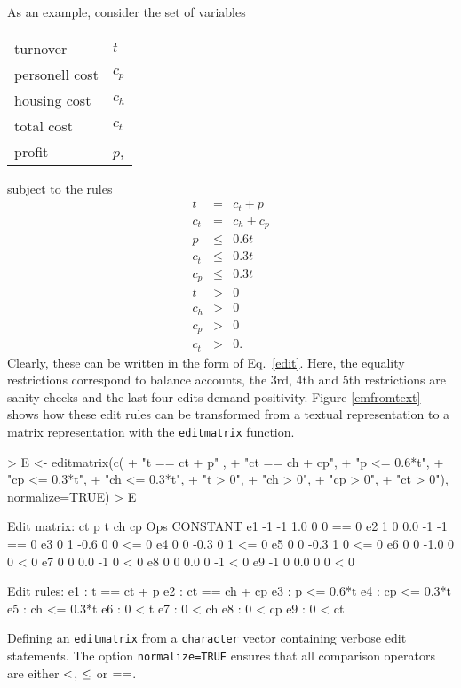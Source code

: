 \documentclass[10pt, fleqn, a4paper]{article}
\begin{document}
As an example, consider the set of variables
\begin{center}
\begin{tabular}{ll}
turnover       & $t$ \\
personell cost & $c_p$\\
housing cost   & $c_h$\\
total cost     & $c_t$\\
profit         & $p$, \\
\end{tabular}
\end{center}
subject to the rules
\begin{eqnarray}
\label{e1}
t   &=& c_t + p\\
c_t &=& c_h + c_p\\ 
p &\leq& 0.6t\\
c_t &\leq& 0.3t\\
c_p&\leq& 0.3t\\
t   &>& 0\\
c_h &>& 0\\
c_p &>& 0\\
\label{e9}
c_t &>& 0.
\end{eqnarray}
Clearly, these can be written in the form of Eq.\ \eqref{edit}.  Here, the
equality restrictions correspond to balance accounts, the 3rd, 4th and 5th
restrictions are sanity checks and the last four edits demand positivity.  
Figure \ref{emfromtext} shows how these edit rules can be
transformed from a textual representation to a matrix representation with the
{\tt editmatrix} function.
%
\begin{Rcode}
\begin{Schunk}
\begin{Sinput}
> E <- editmatrix(c(
+ "t  == ct + p" ,
+ "ct == ch + cp",
+ "p  <= 0.6*t",
+ "cp <= 0.3*t",
+ "ch <= 0.3*t",
+ "t  >  0",
+ "ch >  0",
+ "cp >  0",
+ "ct >  0"), normalize=TRUE)
> E
\end{Sinput}
\begin{Soutput}
Edit matrix:
   ct  p    t ch cp Ops CONSTANT
e1 -1 -1  1.0  0  0  ==        0
e2  1  0  0.0 -1 -1  ==        0
e3  0  1 -0.6  0  0  <=        0
e4  0  0 -0.3  0  1  <=        0
e5  0  0 -0.3  1  0  <=        0
e6  0  0 -1.0  0  0   <        0
e7  0  0  0.0 -1  0   <        0
e8  0  0  0.0  0 -1   <        0
e9 -1  0  0.0  0  0   <        0

Edit rules:
e1 : t == ct + p 
e2 : ct == ch + cp 
e3 : p <= 0.6*t 
e4 : cp <= 0.3*t 
e5 : ch <= 0.3*t 
e6 : 0 < t 
e7 : 0 < ch 
e8 : 0 < cp 
e9 : 0 < ct  
\end{Soutput}
\end{Schunk}
\caption{Defining an {\tt editmatrix} from a {\tt character} vector containing verbose edit statements.
The option {\tt normalize=TRUE} ensures that all comparison operators are either ${\tt <}$, ${\tt \leq}$ or ${\tt ==}$.}
\label{emfromtext}
\end{Rcode}
%
\end{document}
